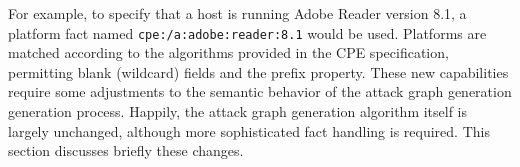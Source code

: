 For example, to specify that a host is running Adobe Reader version 8.1, a 
platform fact named \texttt{cpe:/a:adobe:reader:8.1} would be used. Platforms
are matched according to the algorithms provided in the CPE specification,
permitting blank (wildcard) fields and the prefix property.
These new capabilities require some adjustments to the semantic behavior of the
attack graph generation generation process. Happily, the attack graph generation
algorithm itself is largely unchanged, although more sophisticated fact handling
is required. This section discusses briefly these changes.
